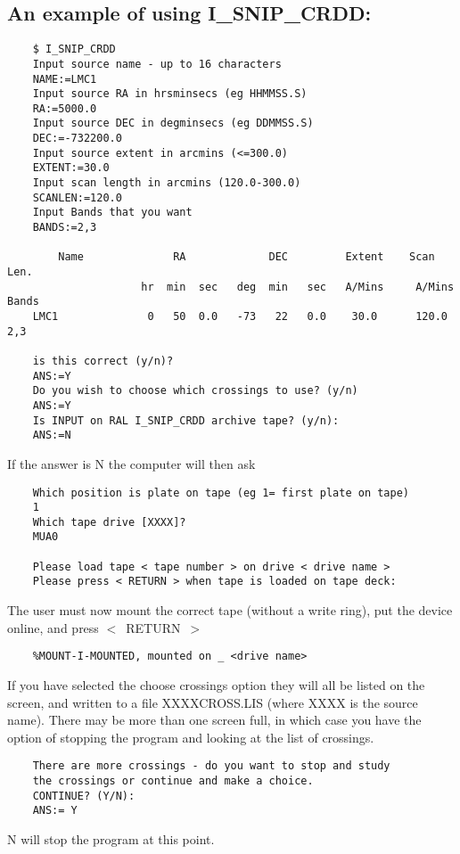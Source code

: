 \subsection {An example of using I\_SNIP\_CRDD:}
\begin{verbatim}
    $ I_SNIP_CRDD
    Input source name - up to 16 characters
    NAME:=LMC1
    Input source RA in hrsminsecs (eg HHMMSS.S)
    RA:=5000.0
    Input source DEC in degminsecs (eg DDMMSS.S)
    DEC:=-732200.0
    Input source extent in arcmins (<=300.0)
    EXTENT:=30.0
    Input scan length in arcmins (120.0-300.0)
    SCANLEN:=120.0
    Input Bands that you want
    BANDS:=2,3

        Name              RA             DEC         Extent    Scan Len.
                     hr  min  sec   deg  min   sec   A/Mins     A/Mins    Bands
    LMC1              0   50  0.0   -73   22   0.0    30.0      120.0      2,3

    is this correct (y/n)?
    ANS:=Y
    Do you wish to choose which crossings to use? (y/n)
    ANS:=Y
    Is INPUT on RAL I_SNIP_CRDD archive tape? (y/n):
    ANS:=N
\end{verbatim}

\vspace {3mm}
If the answer is N the computer will then ask

\begin{verbatim}
    Which position is plate on tape (eg 1= first plate on tape)
    1
    Which tape drive [XXXX]?
    MUA0

    Please load tape < tape number > on drive < drive name >
    Please press < RETURN > when tape is loaded on tape deck:
\end{verbatim}

The user must now mount the correct tape (without a write ring), put
the device online, and press $<$~RETURN~$>$

\begin{verbatim}
    %MOUNT-I-MOUNTED, mounted on _ <drive name>
\end{verbatim}
If you have selected the choose crossings option they will all be listed
on the screen, and written to a file XXXXCROSS.LIS (where XXXX is the source
name).  There may be more than one screen full, in which case you have
the option of stopping the program and looking at the list of crossings.

\begin{verbatim}
    There are more crossings - do you want to stop and study
    the crossings or continue and make a choice.
    CONTINUE? (Y/N):
    ANS:= Y
\end{verbatim}
N will stop the program at this point.

